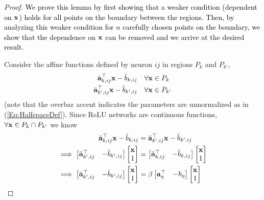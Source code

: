 \begin{proof}
\textcolor{black}{We prove this lemma by first showing that a weaker condition (dependent on $\mathbf{x}$) holds for all points on the boundary between the regions.
Then, by analyzing this weaker condition for $n$ carefully chosen points on the boundary, we show that the dependence on $\mathbf{x}$ can be removed and we arrive at the desired result.}

Consider the affine functions defined by neuron $ij$ in regions $P_k$ and $P_{k'}$,
\begin{subequations}
\begin{align}
    \Bar{\mathbf{a}}_{k,ij}^\top \mathbf{x} -\Bar{b}_{k,ij} \quad &\forall \mathbf{x} \in P_k \\
    \Bar{\mathbf{a}}_{k',ij}^\top \mathbf{x} -\Bar{b}_{k',ij} \quad &\forall \mathbf{x} \in P_{k'}
\end{align}
\end{subequations}
(note that the overbar accent indicates the parameters are unnormalized as in (\ref{Eq:HalfspaceDef}). Since ReLU networks are continuous functions, $\forall \mathbf{x} \in P_k \cap P_{k'}$ we know
\begin{subequations}
\begin{align}
    \Bar{\ba}_{k,ij}^\top \bx -\Bar{b}_{k,ij} &= \Bar{\ba}_{k',ij}^\top \bx -\Bar{b}_{k',ij} \\
    \implies \begin{bmatrix} \multicolumn{2}{c}{\Bar{\ba}_{k',ij}^\top} & -\Bar{b}_{k',ij} \end{bmatrix} \begin{bmatrix} \bx \\ 1 \end{bmatrix} &= 
    \begin{bmatrix} \multicolumn{2}{c}{\Bar{\ba}_{k,ij}^\top} & -\Bar{b}_{k,ij} \end{bmatrix} \begin{bmatrix} \bx \\ 1 \end{bmatrix} \\
    \implies \begin{bmatrix} \multicolumn{2}{c}{\Bar{\ba}_{k',ij}^\top} & -\Bar{b}_{k',ij} \end{bmatrix} \begin{bmatrix} \bx \\ 1 \end{bmatrix} &= 
    \beta \begin{bmatrix}  \multicolumn{2}{c}{\ba_{\eta}^\top} & -b_{\eta} \end{bmatrix} \begin{bmatrix} \bx \\ 1 \end{bmatrix}

\end{align}
\end{subequations}
\end{proof}
